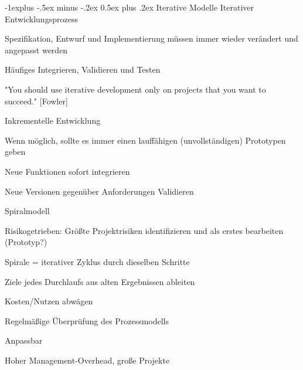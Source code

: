 \documentclass[a4paper]{article}
\makeatletter
\renewcommand{\subsection}{\@startsection{subsection}{2}{0mm}%
                                {-1explus -.5ex minus -.2ex}%
                                {0.5ex plus .2ex}%
                                {\normalfont\normalsize\bfseries}}
\makeatother
\begin{document}
\begin{multicols}{3}
  \subsection{Iterative Modelle}
  Iterativer Entwicklungsprozess
  \begin{itemize*}
    \item Spezifikation, Entwurf und Implementierung müssen immer wieder verändert und angepasst werden
    \item Häufiges Integrieren, Validieren und Testen
    \item "You should use iterative development only on projects that you want to succeed." [Fowler]
  \end{itemize*}

  Inkrementelle Entwicklung
  \begin{itemize*}
    \item Wenn möglich, sollte es immer einen lauffähigen (unvollständigen) Prototypen geben
    \item Neue Funktionen sofort integrieren
    \item Neue Versionen gegenüber Anforderungen Validieren
  \end{itemize*}

  Spiralmodell
  \begin{itemize*}
    \item Risikogetrieben: Größte Projektrisiken identifizieren und als erstes bearbeiten (Prototyp?)
    \item Spirale = iterativer Zyklus durch dieselben Schritte
    \item Ziele jedes Durchlaufs aus alten Ergebnissen ableiten
    \item Kosten/Nutzen abwägen
    \item Regelmäßige Überprüfung des Prozessmodells
    \item Anpassbar
    \item Hoher Management-Overhead, große Projekte
  \end{itemize*}


\end{multicols}
\end{document}
